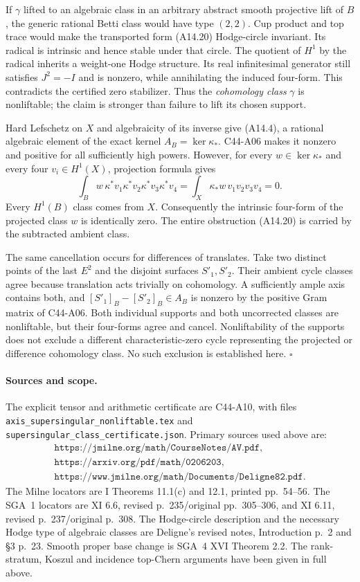 \documentclass[11pt]{article}
\theoremstyle{remark}\newtheorem{remark}[theorem]{Remark}
\begin{document}
If $\gamma$ lifted to an algebraic class in an arbitrary
abstract smooth projective lift of $B$, the generic rational
Betti class would have type $(2,2)$. Cup product and top trace
would make the transported form (A14.20) Hodge-circle invariant.
Its radical is intrinsic and hence stable under that circle.
The quotient of $H^1$ by the radical inherits a weight-one
Hodge structure. Its real infinitesimal generator still
satisfies $J^2=-I$ and is nonzero, while annihilating the induced
four-form. This contradicts the certified zero stabilizer.
Thus the \emph{cohomology class} $\gamma$ is nonliftable;
the claim is stronger than failure to lift its chosen support.

Hard Lefschetz on $X$ and algebraicity of its inverse give
(A14.4), a rational algebraic element of the exact kernel
$A_B=\ker\kappa_*$. C44-A06 makes it nonzero and positive for
all sufficiently high powers. However, for every
$w\in\ker\kappa_*$ and every four $v_i\in H^1(X)$, projection
formula gives
\[
       \int_B w\,\kappa^*v_1\kappa^*v_2\kappa^*v_3\kappa^*v_4
          =\int_X\kappa_*w\,v_1v_2v_3v_4=0.                  \tag{A14.21}
\]
Every $H^1(B)$ class comes from $X$. Consequently the intrinsic
four-form of the projected class $w$ is identically zero.
The entire obstruction (A14.20) is carried by the subtracted
ambient class.

The same cancellation occurs for differences of translates.
Take two distinct points of the last $E^2$ and the disjoint
surfaces $S'_1,S'_2$. Their ambient cycle classes agree because
translation acts trivially on cohomology. A sufficiently ample
axis contains both, and
$[S'_1]_B-[S'_2]_B\in A_B$ is nonzero by the positive Gram
matrix of C44-A06. Both individual supports and both
uncorrected classes are nonliftable, but their four-forms agree
and cancel. Nonliftability of the supports does not exclude a
different characteristic-zero cycle representing the projected
or difference cohomology class. No such exclusion is established
here. \hfill$\square$

\paragraph{Sources and scope.}
The explicit tensor and arithmetic certificate are C44-A10,
with files \texttt{axis\_supersingular\_nonliftable.tex} and
\texttt{supersingular\_class\_certificate.json}.
Primary sources used above are:
\[
 \begin{gathered}
 \texttt{https://jmilne.org/math/CourseNotes/AV.pdf},\\
 \texttt{https://arxiv.org/pdf/math/0206203},\\
 \texttt{https://www.jmilne.org/math/Documents/Deligne82.pdf}.
 \end{gathered}
\]
The Milne locators are I Theorems 11.1(c) and 12.1,
printed pp.~54--56. The SGA~1 locators are XI 6.6, revised
p.~235/original pp.~305--306, and XI 6.11, revised p.~237/original
p.~308. The Hodge-circle description and the necessary Hodge
type of algebraic classes are Deligne's revised notes,
Introduction p.~2 and \S3 p.~23. Smooth proper base change is
SGA~4 XVI Theorem 2.2. The rank-stratum, Koszul and incidence
top-Chern arguments have been given in full above.
\end{document}
